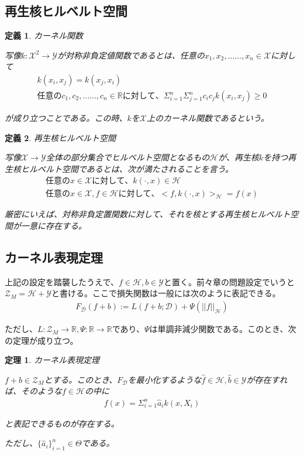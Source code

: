 \documentclass[dvipdfmx, a4paper]{jsarticle}
\newtheorem{theo}{定理}[section]
\newtheorem{defi}{定義}[section]
\begin{document}
\subsection{再生核ヒルベルト空間}
\begin{defi}カーネル関数

写像$k:\mathcal{X}^2\to\mathcal{Y}$が対称非負定値関数であるとは、任意の$x_1,x_2,......,x_n\in \mathcal{X}$に対して
\begin{align}
k(x_i,x_j)=k(x_j,x_i)\\
任意のc_1,c_2,......,c_n\in\mathbb{R}に対して、\Sigma^n_{i=1}\Sigma^n_{j=1}c_ic_jk(x_i,x_j)\geq0
\end{align}

が成り立つことである。この時、$k$を$\mathcal{X}$上のカーネル関数であるという。
\end{defi}
\begin{defi}再生核ヒルベルト空間

写像$\mathcal{X}\to\mathcal{Y}$全体の部分集合でヒルベルト空間となるもの$\mathcal{H}$が、再生核$k$を持つ再生核ヒルベルト空間であるとは、次が満たされることを言う。
\begin{align}
任意のx\in\mathcal{X}に対して、k(\cdot,x)\in\mathcal{H}\\
任意のx\in\mathcal{X},f\in\mathcal{H}に対して、<f,k(\cdot,x)>_\mathcal{H}=f(x)
\end{align}

厳密にいえば、対称非負定置関数に対して、それを核とする再生核ヒルベルト空間が一意に存在する。
\end{defi}

\subsection{カーネル表現定理}
上記の設定を踏襲したうえで、$f\in\mathcal{H},b\in\mathcal{Y}$と置く。前々章の問題設定でいうと$\mathcal{Z}_M=\mathcal{H}+\mathcal{Y}$と書ける。ここで損失関数は一般には次のように表記できる。
\begin{align}
F_\mathcal{D}(f+b):=L(f+b;\mathcal{D})+\Psi(||f||_\mathcal{H})
\end{align}

ただし、$L:\mathcal{Z}_M\to\mathbb{R},\Psi:\mathbb{R}\to\mathbb{R}$であり、$\Psi$は単調非減少関数である。このとき、次の定理が成り立つ。
\begin{theo}カーネル表現定理

$f+b\in\mathcal{Z}_M$とする。このとき、$F_\mathcal{D}$を最小化するような$\hat{f}\in\mathcal{H},\hat{b}\in\mathcal{Y}$が存在すれば、そのような$f\in\mathcal{H}$の中に
\begin{align}
f(x)=\Sigma^n_{i=1}\hat{a}_ik(x,X_i)
\end{align}

と表記できるものが存在する。

ただし、$\{\hat{a}_i\}^n_{i=1}\in\Theta$である。
\end{theo}
\end{document}
